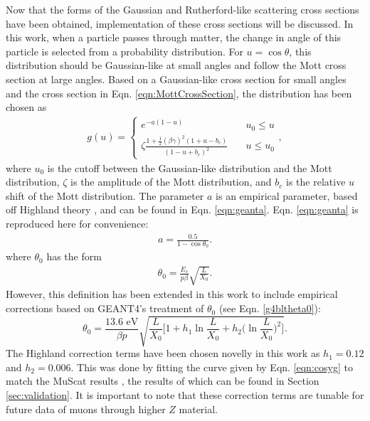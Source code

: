 \label{ssc:COSYScatteringImplementation} Now that the forms of the Gaussian and Rutherford-like scattering cross sections have been obtained, implementation of these cross sections will be discussed. In this work, when a particle passes through matter, the change in angle of this particle is selected from a probability distribution. For $u=\cos\theta$, this distribution should be Gaussian-like at small angles \cite{gs} and follow the Mott cross section at large angles. Based on a Gaussian-like cross section for small angles and the cross section in Eqn. \ref{eqn:MottCrossSection}, the distribution has been chosen as
\begin{align}\label{eqn:cosyg}
g(u)=	\begin{cases}
	e^{-a(1-u)} & \quad u_0 \leq u \\
	\zeta\frac{1+\frac{1}{2}(\beta\gamma)^2(1+u-b_c)}{(1-u+b_c)^2} & \quad u\leq u_0
	\end{cases},
\end{align}
where $u_0$ is the cutoff between the Gaussian-like distribution and the Mott distribution, $\zeta$ is the amplitude of the Mott distribution, and $b_c$ is the relative $u$ shift of the Mott distribution. The parameter $a$ is an empirical parameter, based off Highland theory \cite{highland}, and can be found in Eqn. \ref{eqn:geanta}. Eqn. \ref{eqn:geanta} is reproduced here for convenience:
\begin{align*}
a=\frac{0.5}{1-\cos\theta_0}.
\end{align*}
where $\theta_0$ has the form \cite{highland} 
\begin{align*}
\theta_0 = \frac{E_s}{p\beta} \sqrt{\frac{L}{X_0}}.
\end{align*}
However, this definition has been extended in this work to include empirical corrections based on GEANT4's \cite{geant4} treatment of $\theta_0$ (see Eqn. \ref{g4bltheta0}):
\begin{equation}\label{eqn:cosytheta0}
\theta_0 = \frac{13.6 \text{ eV}}{\beta p} \sqrt{\frac{L}{X_0} \Big[ 1+h_1 \ln \frac{L}{X_0} + h_2 \Big(\ln \frac{L}{X_0}\Big)^2 \Big] }.
\end{equation}
The Highland correction terms have been chosen novelly in this work as $h_1=0.12$ and $h_2=0.006$. This was done by fitting the curve given by Eqn. \ref{eqn:cosyg} to match the MuScat results \cite{muscat}, the results of which can be found in Section \ref{sec:validation}. It is important to note that these correction terms are tunable for future data of muons through higher $Z$ material.

